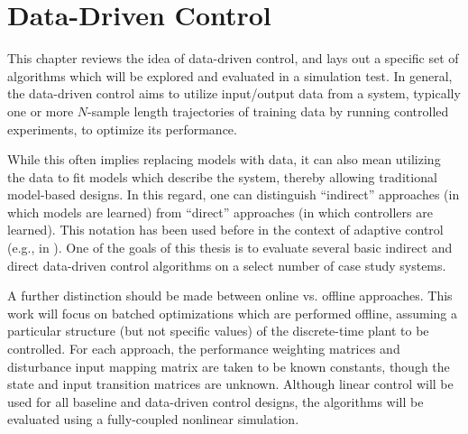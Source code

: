 \chapter{Data-Driven Control}
\label{chap:DataDrivenControl}
This chapter reviews the idea of data-driven control, and lays out a specific set of algorithms which will be explored and evaluated in a simulation test.  In general, the data-driven control aims to utilize input/output data from a system, typically one or more $N$-sample length trajectories of training data by running controlled experiments, to optimize its performance.

While this often implies replacing models with data, it can also mean utilizing the data to fit models which describe the system, thereby allowing traditional model-based designs.  In this regard, one can distinguish ``indirect'' approaches (in which models are learned) from ``direct'' approaches (in which controllers are learned).  This notation has been used before in the context of adaptive control (e.g., in \cite{slotineli}).  One of the goals of this thesis is to evaluate several basic indirect and direct data-driven control algorithms on a select number of case study systems.

A further distinction should be made between online vs. offline approaches.  This work will focus on batched optimizations which are performed offline, assuming a particular structure (but not specific values) of the discrete-time plant to be controlled.  For each approach, the performance weighting matrices and disturbance input mapping matrix are taken to be known constants, though the state and input transition matrices are unknown.  Although linear control will be used for all baseline and data-driven control designs, the algorithms will be evaluated using a fully-coupled nonlinear simulation.

